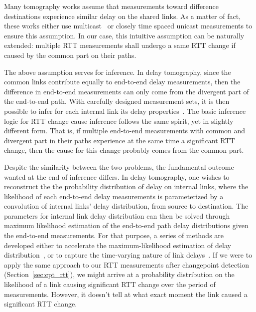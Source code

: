 Many tomography works assume that measurements toward difference destinations experience similar delay on the shared links. As a matter of fact, these works either use multicast~\cite{LoPresti2002} or closely time spaced unicast measurements\cite{Shih2003,Tsang2003} to ensure this assumption. In our case, this intuitive assumption can be naturally extended: multiple RTT measurements shall undergo a same RTT change if caused by the common part on their paths.

The above assumption serves for inference. In delay tomography, since the common links contribute equally to end-to-end delay measurements, then the difference in end-to-end measurements can only come from the divergent part of the end-to-end path. With carefully designed measurement sets, it is then possible to infer for each internal link its delay properties~\cite{Lawrence2006}.
The basic inference logic for RTT change cause inference follows the same spirit, yet in slightly different form. That is, if multiple end-to-end measurements with common and divergent part in their paths experience at the same time a significant RTT change, then the cause for this change probably comes from the common part.

Despite the similarity between the two problems, the fundamental outcome wanted at the end of inference differs.
In delay tomography, one wishes to reconstruct the the probability distribution of delay on internal links, where the likelihood of each end-to-end delay measurements is parameterized by a convolution of internal links' delay distribution, from source to destination.
The parameters for internal link delay distribution can then be solved through maximum likelihood estimation of the end-to-end path delay distributions given the end-to-end measurements.
For that purpose, a series of methods are developed either to accelerate the maximum-likelihood estimation of delay distribution~\cite{Liang2003, Tsang2003}, or to capture the time-varying nature of link delays~\cite{Shih2003,Coates2002a,Tsang2003}.
If we were to apply the same approach to our RTT measurements after changepoint detection (Section~\ref{sec:cpt_rtt}), we might arrive at a probability distribution on the likelihood of a link causing significant RTT change over the period of measurements. However, it doesn't tell at what exact moment the link caused a significant RTT change.

